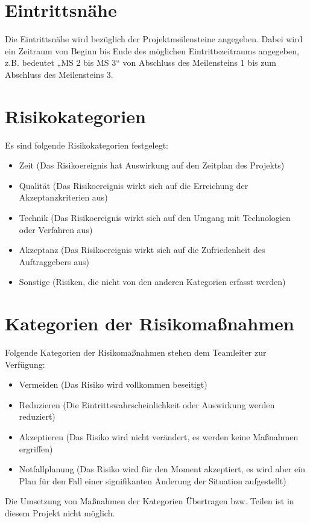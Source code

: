 \documentclass[a4paper,11pt,listof=numbered,glossary=totoc,parskip=half]{scrreprt}
\begin{document}
\section{Eintrittsnähe}
\label{subsec:eintrittsnaehe}

Die Eintrittsnähe wird bezüglich der Projektmeilensteine angegeben. Dabei wird ein Zeitraum von Beginn bis Ende des möglichen Eintrittszeitraums angegeben, z.B. bedeutet „MS 2 bis MS 3“ von Abschluss des Meilensteins 1 bis zum Abschluss des Meilensteins 3.

\section{Risikokategorien}
\label{subsec:risikokategorien}

Es sind folgende Risikokategorien festgelegt:
\begin{itemize}
	\item Zeit (Das Risikoereignis hat Auswirkung auf den Zeitplan des Projekts)
	\item Qualität (Das Risikoereignis wirkt sich auf die Erreichung der Akzeptanzkriterien aus)
	\item Technik (Das Risikoereignis wirkt sich auf den Umgang mit Technologien oder Verfahren aus)
	\item Akzeptanz (Das Risikoereignis wirkt sich auf die Zufriedenheit des Auftraggebers aus)
	\item Sonstige (Risiken, die nicht von den anderen Kategorien erfasst werden)
\end{itemize}

\section{Kategorien der Risikomaßnahmen}

Folgende Kategorien der Risikomaßnahmen stehen dem Teamleiter zur Verfügung:
\begin{itemize}
	\item Vermeiden (Das Risiko wird vollkommen beseitigt)
	\item Reduzieren (Die Eintrittswahrscheinlichkeit oder Auswirkung werden reduziert)
	\item Akzeptieren (Das Risiko wird nicht verändert, es werden keine Maßnahmen ergriffen)
	\item Notfallplanung (Das Risiko wird für den Moment akzeptiert, es wird aber ein Plan für den Fall einer signifikanten Änderung der Situation aufgestellt)
\end{itemize}

Die Umsetzung von Maßnahmen der Kategorien Übertragen bzw. Teilen ist in diesem Projekt nicht möglich.

	\newpage	
	\printbibliography[heading=bibnumbered,title=Literaturverzeichnis]
\end{document}
